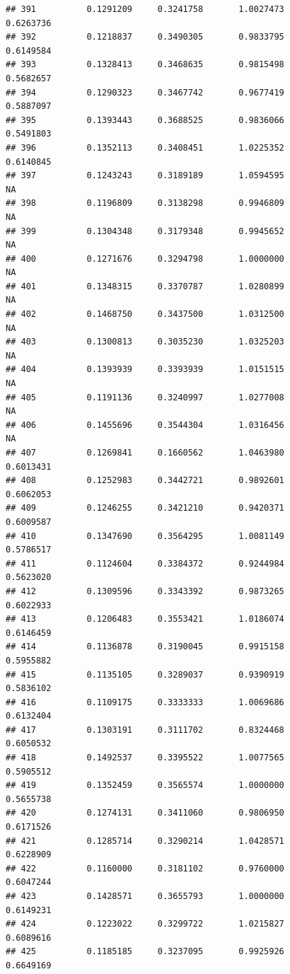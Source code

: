 \documentclass[]{article}
\begin{document}
\begin{verbatim}
## 391          0.1291209     0.3241758       1.0027473          0.6263736
## 392          0.1218837     0.3490305       0.9833795          0.6149584
## 393          0.1328413     0.3468635       0.9815498          0.5682657
## 394          0.1290323     0.3467742       0.9677419          0.5887097
## 395          0.1393443     0.3688525       0.9836066          0.5491803
## 396          0.1352113     0.3408451       1.0225352          0.6140845
## 397          0.1243243     0.3189189       1.0594595                 NA
## 398          0.1196809     0.3138298       0.9946809                 NA
## 399          0.1304348     0.3179348       0.9945652                 NA
## 400          0.1271676     0.3294798       1.0000000                 NA
## 401          0.1348315     0.3370787       1.0280899                 NA
## 402          0.1468750     0.3437500       1.0312500                 NA
## 403          0.1300813     0.3035230       1.0325203                 NA
## 404          0.1393939     0.3393939       1.0151515                 NA
## 405          0.1191136     0.3240997       1.0277008                 NA
## 406          0.1455696     0.3544304       1.0316456                 NA
## 407          0.1269841     0.1660562       1.0463980          0.6013431
## 408          0.1252983     0.3442721       0.9892601          0.6062053
## 409          0.1246255     0.3421210       0.9420371          0.6009587
## 410          0.1347690     0.3564295       1.0081149          0.5786517
## 411          0.1124604     0.3384372       0.9244984          0.5623020
## 412          0.1309596     0.3343392       0.9873265          0.6022933
## 413          0.1206483     0.3553421       1.0186074          0.6146459
## 414          0.1136878     0.3190045       0.9915158          0.5955882
## 415          0.1135105     0.3289037       0.9390919          0.5836102
## 416          0.1109175     0.3333333       1.0069686          0.6132404
## 417          0.1303191     0.3111702       0.8324468          0.6050532
## 418          0.1492537     0.3395522       1.0077565          0.5905512
## 419          0.1352459     0.3565574       1.0000000          0.5655738
## 420          0.1274131     0.3411060       0.9806950          0.6171526
## 421          0.1285714     0.3290214       1.0428571          0.6228909
## 422          0.1160000     0.3181102       0.9760000          0.6047244
## 423          0.1428571     0.3655793       1.0000000          0.6149231
## 424          0.1223022     0.3299722       1.0215827          0.6089616
## 425          0.1185185     0.3237095       0.9925926          0.6649169

\end{verbatim}
\end{document}
